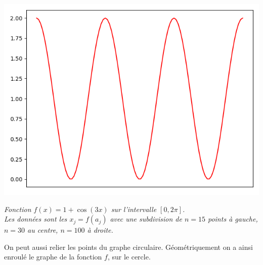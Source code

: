\documentclass[11pt,class=report,crop=false]{standalone}
\begin{document}
\begin{center}
\includegraphics[scale=\myscale,scale=0.33]{figures/fourier-4c}


\nopagebreak

\begin{minipage}{0.8\textwidth}
\center\emph{
Fonction $f(x) = 1+\cos(3x)$ sur l'intervalle $[0,2\pi]$.\\
Les données sont les $x_j = f(a_j)$ avec une subdivision de $n=15$ points à gauche,\\
$n=30$ au centre, $n=100$ à droite. %
}
\end{minipage}

\end{center}

On peut aussi relier les points du graphe circulaire. Géométriquement on a ainsi enroulé le graphe de la fonction $f$, sur le cercle.
\end{document}

